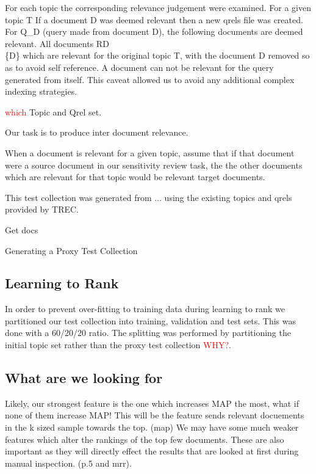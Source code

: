 \documentclass{mpaper}
\newcommand{\remove}[1]{\textcolor{red}{#1}}
\begin{document}
For each topic the corresponding relevance judgement were examined.
For a given topic T
If a document D was deemed relevant then a new qrels file was created.
For Q\_D (query made from document D), the following documents are deemed relevant.
All documents RD\\\{D\} which are relevant for the original topic T, with the document D removed so as to avoid self reference. A document can not be relevant for the query generated from itself. This caveat allowed us to avoid any additional complex indexing strategies.

\remove{which} Topic and Qrel set.

Our task is to produce inter document relevance.

When a document is relevant for a given topic, assume that if that document were a source document in our sensitivity review task, the the other documents which are relevant for that topic would be relevant target documents.

This test collection was generated from ... using the existing topics and qrels provided by TREC.

\begin{algorithm}
\SetAlgoLined
{}
 Get docs\;
 \caption{Generating a Proxy Test Collection}
\end{algorithm}

\subsection{Learning to Rank}
In order to prevent over-fitting to training data during learning to rank we partitioned our test collection into training, validation and test sets.
This was done with a 60/20/20 ratio.
The splitting was performed by partitioning the initial topic set rather than the proxy test collection \remove{WHY?}.

\subsection{What are we looking for}
Likely, our strongest feature is the one which increases MAP the most, what if none of them increase MAP! This will be the feature sends relevant docuements in the k sized sample towards the top. (map)
We may have some much weaker features which alter the rankings of the top few documents. These are also important as they will directly effect the results that are looked at first during manual inspection. (p.5 and mrr).
\end{document}
